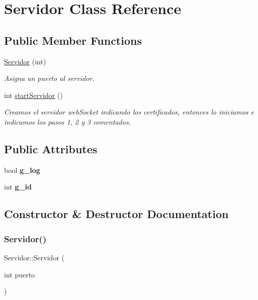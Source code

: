 \hypertarget{classServidor}{}\section{Servidor Class Reference}
\label{classServidor}
\subsection*{Public Member Functions}
\begin{DoxyCompactItemize}
\item 
\mbox{\hyperlink{classServidor_ab62fda340e2085f8269b8e04417a90c9}{Servidor}} (int)
\begin{DoxyCompactList}\small\item\em Asigna un puerto al servidor. \end{DoxyCompactList}\item 
int \mbox{\hyperlink{classServidor_a43733f2069b63eb58edcbb61fa6a63ec}{start\+Servidor}} ()
\begin{DoxyCompactList}\small\item\em Creamos el servidor web\+Socket indicando los certificados, entonces lo iniciamos e indicamos los pasos 1, 2 y 3 comentados. \end{DoxyCompactList}\end{DoxyCompactItemize}
\subsection*{Public Attributes}
\begin{DoxyCompactItemize}
\item 
\mbox{\label{classServidor_aa986a70cdbbe5ed8ebfe708e8912a114}} 
bool {\bfseries g\+\_\+log}
\item 
\mbox{\label{classServidor_a23ae116efb901142fa24e0cda16a83e3}} 
int {\bfseries g\+\_\+id}
\end{DoxyCompactItemize}


\subsection{Constructor \& Destructor Documentation}
\mbox{\label{classServidor_ab62fda340e2085f8269b8e04417a90c9}} 
\subsubsection{\texorpdfstring{Servidor()}{Servidor()}}
{\footnotesize\ttfamily Servidor\+::\+Servidor (\begin{DoxyParamCaption}\item[{int}]{puerto }\end{DoxyParamCaption})}



